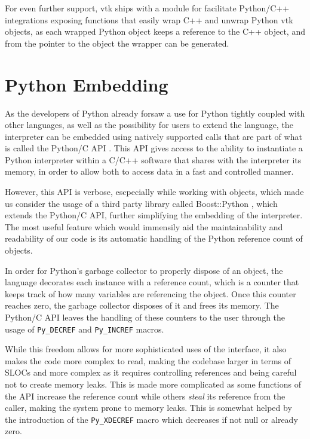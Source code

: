 For even further support, \acrshort{vtk} ships with a module for facilitate Python/C++ integrations exposing functions that easily wrap C++ and unwrap Python \acrshort{vtk} objects, as each wrapped Python object keeps a reference to the C++ object, and from the pointer to the object the wrapper can be generated.

\section{Python Embedding}

As the developers of Python already forsaw a use for Python tightly coupled with other languages, as well as the possibility for users to extend the language, the interpreter can be embedded using natively supported calls that are part of what is called the Python/C API \cite{python_c_api}. This API gives access to the ability to instantiate a Python interpreter within a C/C++ software that shares with the interpreter its memory, in order to allow both to access data in a fast and controlled manner.

However, this API is verbose, escpecially while working with objects, which made us consider the usage of a third party library called Boost::Python
, which extends the Python/C API, further simplifying the embedding of the interpreter. The most useful feature which would immensily aid the maintainability and readability of our code is its automatic handling of the Python reference count of objects.

In order for Python's garbage collector to properly dispose of an object, the language decorates each instance with a reference count, which is a counter that keeps track of how many variables are referencing the object. Once this counter reaches zero, the garbage collector disposes of it and frees its memory. The Python/C API leaves the handling of these counters to the user through the usage of \verb|Py_DECREF| and \verb|Py_INCREF| macros.

While this freedom allows for more sophisticated uses of the interface, it also makes the code more complex to read, making the codebase larger in terms of SLOCs and more complex as it requires controlling references and being careful not to create memory leaks. This is made more complicated as some functions of the API increase the reference count while others \textit{steal} its reference from the caller, making the system prone to memory leaks. This is somewhat helped by the introduction of the \verb|Py_XDECREF| macro which decreases if not null or already zero.


